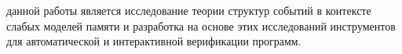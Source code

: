 










{\aim} данной работы является исследование 
теории структур событий в контексте слабых моделей памяти
и разработка на основе этих исследований 
инструментов для автоматической и интерактивной верификации программ. 

